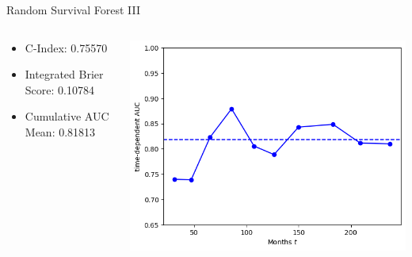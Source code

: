 \documentclass{beamer}
\begin{document}
\begin{frame}{Random Survival Forest III}
    \begin{columns}
        \begin{column}{0.49 \textwidth}
            \begin{itemize}
                \item C-Index: 0.75570
                \item Integrated Brier Score: 0.10784
                \item Cumulative AUC Mean: 0.81813
            \end{itemize}
        \end{column}
        \begin{column}{0.49 \textwidth}
            \centering
            \includegraphics[width = \textwidth]{images/rsf_auc.png}
        \end{column}
    \end{columns}
\end{frame}
\end{document}
